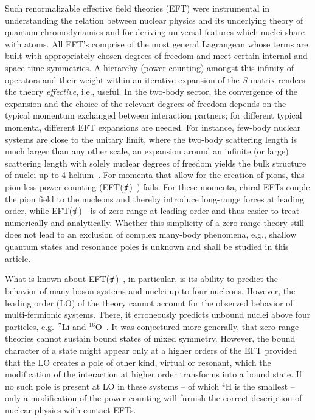 \documentclass[aps,onecolumn,preprintnumbers,amsmath,amssymb,nofootinbib,superscriptaddress,notitlepage]{revtex4-1}
\newcommand{\eftnopi}{\mbox{EFT($\slashed{\pi}$) }}
\begin{document}
%
Such renormalizable effective field theories (EFT) were instrumental in understanding
the relation between nuclear physics and its underlying theory of quantum chromodynamics
and for deriving universal features which nuclei share with atoms.
All EFT's comprise of the most general Lagrangean whose terms are built with
appropriately chosen degrees of freedom and meet certain internal and space-time symmetries.
A hierarchy (power counting) amongst this infinity of operators and their weight within
an iterative expansion of the $S$-matrix renders the theory {\it effective}, i.e., useful.
In the two-body sector, the convergence of the expansion and the choice of the relevant
degrees of freedom depends on the typical momentum exchanged between interaction partners;
for different typical momenta, different EFT expansions are needed. 
For instance, few-body nuclear systems are close to the unitary limit, where the two-body
scattering length is much larger than any other scale, an
expansion around an infinite (or large) scattering length with solely nuclear degrees of freedom
yields the bulk structure of nuclei up to 4-helium~\cite{vanKolck:1999mw}.
For momenta that allow for the creation of pions, this pion-less power counting (\eftnopi)
fails. For these momenta, chiral EFTs couple the pion field to the nucleons and thereby
introduce long-range forces at leading order, while \eftnopi~is of zero-range at
leading order and thus easier to treat numerically and analytically.
Whether this simplicity of a zero-range theory still does not lead to an exclusion
of complex many-body phenomena, e.g., shallow quantum states and resonance poles is
unknown and shall be studied in this article.

What is known about \eftnopi, in particular, is its ability to predict the behavior
of many-boson systems and nuclei up to four nucleons. 
However, the leading order (LO) of the theory cannot account for the observed behavior of
multi-fermionic systems. There, it erroneously predicts unbound nuclei above four
particles, e.g.~$^7$Li and $^{16}$O~\cite{Schafer:2020ivj,Contessi:2017rww}.
It was conjectured more generally, that zero-range theories cannot sustain 
bound states of mixed symmetry.
However, the bound character of a state might appear only at a higher orders of the EFT
provided that the LO creates a pole of other kind, virtual or resonant, which the
modification of the interaction at higher order transforms into a bound state. 
If no such pole is present at LO in these systems -- of which $^4$H is the smallest --
only a modification of the power counting
will furnish the correct description of nuclear physics with contact EFTs.
\end{document}
